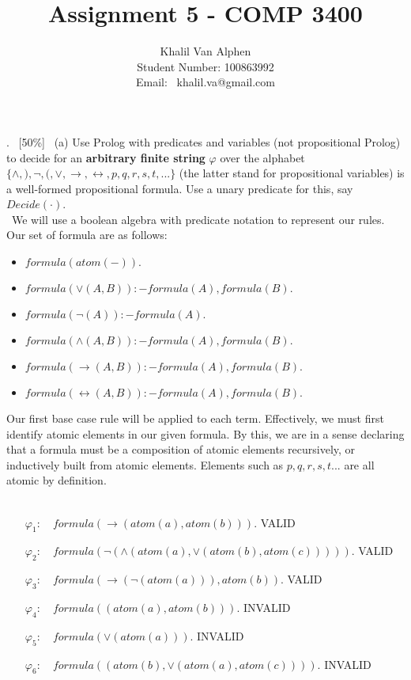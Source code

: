 \documentclass[fullpage]{article}
\title{\vspace*{-2cm}\bf Assignment 5 - COMP 3400}
\author{Khalil Van Alphen\\
Student Number: 100863992\\
Email: \  khalil.va@gmail.com}
\date{}
\begin{document}
\maketitle
\pagestyle{plain}
\thispagestyle{empty}

. \ [50\%] \ (a) Use Prolog with predicates and variables (not propositional Prolog) to decide
for an {\bf arbitrary finite string} $\varphi$ over the alphabet $\{\wedge, ), \neg, (, \vee, \rightarrow, \leftrightarrow, p, q, r, s, t, ...\}$ (the latter stand for propositional variables) is  a well-formed propositional formula. Use a unary predicate
for this, say ${Decide}(\cdot)$.\\

 \ We will use a boolean algebra with predicate notation to represent our rules. Our set of formula are as follows:
\begin{itemize}
\item {\em $formula(atom(-)).$}
\item {\em $formula(\vee(A, B)):- formula(A), formula(B).$}
\item {\em $formula(\neg(A)):- formula(A).$}
\item {\em $formula(\wedge(A, B)):- formula(A), formula(B).$}
\item {\em $formula(\rightarrow(A, B)):- formula(A), formula(B).$}
\item {\em $formula(\leftrightarrow(A, B)):- formula(A), formula(B).$}
\end{itemize}
Our first base case rule will be applied to each term. Effectively, we must first identify atomic elements in our given formula. By this, we are in a sense declaring that a formula must be a composition of atomic elements recursively, or inductively built from atomic elements. Elements such as ${p,q,r,s,t...}$ are all atomic by definition.\\
 \ 
\begin{itemize}
\item[$\varphi_1$:]~ ${formula(\rightarrow(atom(a),atom(b))).}$ VALID
\item[$\varphi_2$:]~ ${formula(\neg(\wedge(atom(a),\vee(atom(b),atom(c))))).}$ VALID
\item[$\varphi_3$:]~ ${formula(\rightarrow(\neg(atom(a))),atom(b)).}$ VALID
\item[$\varphi_4$:]~ ${formula((atom(a),atom(b))).}$ INVALID
\item[$\varphi_5$:]~ ${formula(\vee(atom(a))).}$ INVALID
\item[$\varphi_6$:]~ ${formula((atom(b),\vee(atom(a),atom(c)))).}$ INVALID
\end{itemize}
\end{document}
